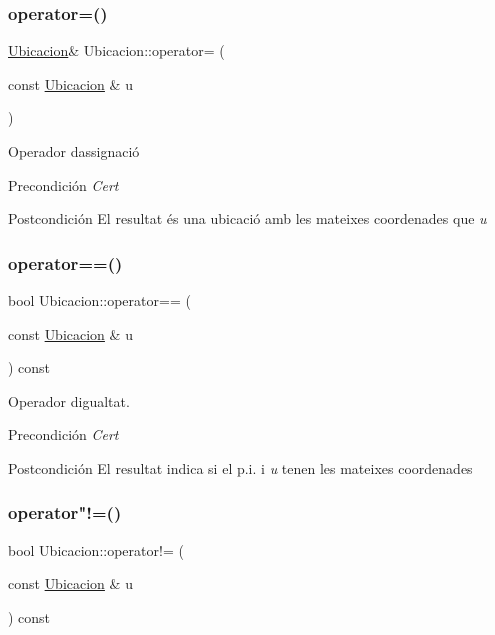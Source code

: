 \subsubsection{\texorpdfstring{operator=()}{operator=()}}
{\footnotesize\ttfamily \hyperlink{class_ubicacion}{Ubicacion}\& Ubicacion\+::operator= (\begin{DoxyParamCaption}\item[{const \hyperlink{class_ubicacion}{Ubicacion} \&}]{u }\end{DoxyParamCaption})}



Operador d\textquotesingle{}assignació 

\begin{DoxyPrecond}{Precondición}
{\itshape Cert} 
\end{DoxyPrecond}
\begin{DoxyPostcond}{Postcondición}
El resultat és una ubicació amb les mateixes coordenades que {\itshape u} 
\end{DoxyPostcond}
\mbox{\label{class_ubicacion_a4fd8b3d7d42695cc4852771e34ab63bc}} 
\subsubsection{\texorpdfstring{operator==()}{operator==()}}
{\footnotesize\ttfamily bool Ubicacion\+::operator== (\begin{DoxyParamCaption}\item[{const \hyperlink{class_ubicacion}{Ubicacion} \&}]{u }\end{DoxyParamCaption}) const}



Operador d\textquotesingle{}igualtat. 

\begin{DoxyPrecond}{Precondición}
{\itshape Cert} 
\end{DoxyPrecond}
\begin{DoxyPostcond}{Postcondición}
El resultat indica si el p.\+i. i {\itshape u} tenen les mateixes coordenades 
\end{DoxyPostcond}
\mbox{\label{class_ubicacion_a5caac27fa52a8e5fddd5ab50b0d56bd1}} 
\subsubsection{\texorpdfstring{operator"!=()}{operator!=()}}
{\footnotesize\ttfamily bool Ubicacion\+::operator!= (\begin{DoxyParamCaption}\item[{const \hyperlink{class_ubicacion}{Ubicacion} \&}]{u }\end{DoxyParamCaption}) const}



